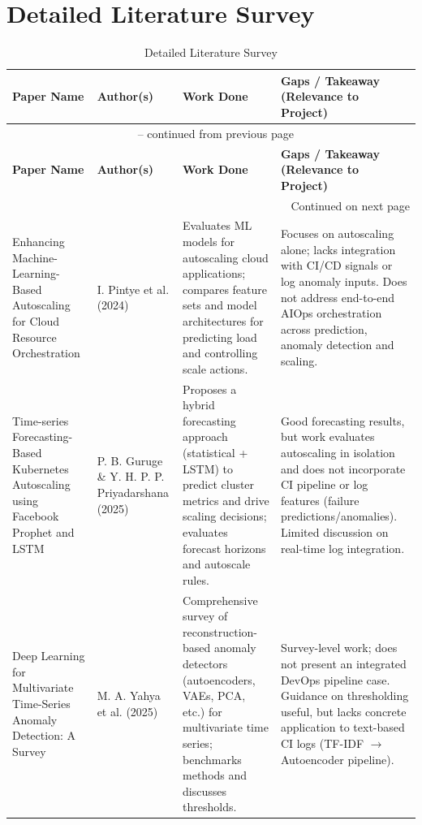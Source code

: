 \documentclass[12pt]{report}
\begin{document}
\section{Detailed Literature Survey}

\begin{longtable}{|p{3.9cm}|p{2.9cm}|p{4.0cm}|p{3.4cm}|}
\caption{Detailed Literature Survey}
\label{table:lit_survey} \\
\hline
\textbf{Paper Name} & \textbf{Author(s)} & \textbf{Work Done} & \textbf{Gaps / Takeaway (Relevance to Project)} \\
\hline
\endfirsthead

\multicolumn{4}{c}{{\tablename\ \thetable{} -- continued from previous page}} \\
\hline
\textbf{Paper Name} & \textbf{Author(s)} & \textbf{Work Done} & \textbf{Gaps / Takeaway (Relevance to Project)} \\
\hline
\endhead

\hline \multicolumn{4}{r}{{Continued on next page}} \\
\endfoot

\hline
\endlastfoot


Enhancing Machine-Learning-Based Autoscaling for Cloud Resource Orchestration &
I. Pintye et al. (2024) &
Evaluates ML models for autoscaling cloud applications; compares feature sets and model architectures for predicting load and controlling scale actions. &
Focuses on autoscaling alone; lacks integration with CI/CD signals or log anomaly inputs. Does not address end-to-end AIOps orchestration across prediction, anomaly detection and scaling. \\
\hline

Time-series Forecasting-Based Kubernetes Autoscaling using Facebook Prophet and LSTM &
P. B. Guruge \& Y. H. P. P. Priyadarshana (2025) &
Proposes a hybrid forecasting approach (statistical + LSTM) to predict cluster metrics and drive scaling decisions; evaluates forecast horizons and autoscale rules. &
Good forecasting results, but work evaluates autoscaling in isolation and does not incorporate CI pipeline or log features (failure predictions/anomalies). Limited discussion on real-time log integration. \\
\hline

Deep Learning for Multivariate Time-Series Anomaly Detection: A Survey &
M. A. Yahya et al. (2025) &
Comprehensive survey of reconstruction-based anomaly detectors (autoencoders, VAEs, PCA, etc.) for multivariate time series; benchmarks methods and discusses thresholds. &
Survey-level work; does not present an integrated DevOps pipeline case. Guidance on thresholding useful, but lacks concrete application to text-based CI logs (TF-IDF $\rightarrow$ Autoencoder pipeline). \\
\hline


\end{longtable}
\end{document}
